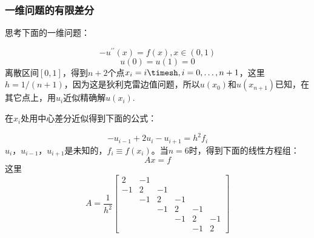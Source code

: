 \documentclass{article}
\begin{document}
\subsubsection{一维问题的有限差分}
思考下面的一维问题：

$$-u^{\prime\prime}(x)=f(x),x\in(0,1)$$
$$u(0)=u(1)=0$$
离散区间$[0,1]$，得到$n+2$个点$x_i=i\timesh,i=0,\ldots ,n+1$，这里$h=1/(n+1)$，因为这是狄利克雷边值问题，所以$u(x_0)$和$u(x_{n+1})$已知，在其它点上，用$u_i$近似精确解$u(x_i)$.

在$x_i$处用中心差分近似得到下面的公式：

$$-u_{i-1}+2u_i-u_{i+1}=h^2f_{i}$$
$u_i$，$u_{i-1}$，$u_{i+1}$是未知的，$f_i\equiv f(x_i)$。当$n=6$时，得到下面的线性方程组：
$$Ax=f$$
这里$$A=\frac{1}{h^2}\begin{bmatrix}
2 & {-1}\\
-1 & 2 & {-1}\\
 & {-1} & 2 & {-1}\\
 &  & {-1} & 2 & {-1}\\
 &  &  & {-1} & 2 & {-1}\\
 &  &  &  & {-1} & 2 
\end{bmatrix}$$



 
\end{document}
